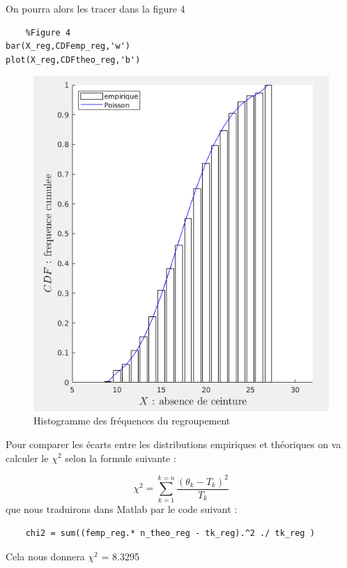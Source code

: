 \documentclass[a4paper,oneside]{article}
\makeatletter
\def\bigcenter{\trivlist \bigcentering\item\relax}
\def\bigcentering{\let\\\@centercr\rightskip\@bigflushglue%
\leftskip\@bigflushglue
\parindent\z@\parfillskip\z@skip}
\makeatother
\begin{document}
\begin{enumerate}
On pourra alors les tracer dans la figure 4 

\begin{lstlisting}
	%Figure 4
bar(X_reg,CDFemp_reg,'w')
plot(X_reg,CDFtheo_reg,'b')
\end{lstlisting}


\begin{figure}[h!]
\bigcenter
\includegraphics[scale=0.7]{fig2_sub2.png}
\caption{Histogramme des fréquences du regroupement}
\end{figure}
\newpage
\item

Pour comparer les écarts entre les distributions empiriques et théoriques on va calculer le $\chi^2$
selon la formule suivante :

\[
	\chi^2 = \sum_{k=1}^{k=n} \frac{(\theta_k - T_k)^2}{T_k}
\]
 que nous traduirons dans Matlab par le code suivant :
\begin{lstlisting}
	chi2 = sum((femp_reg.* n_theo_reg - tk_reg).^2 ./ tk_reg ) 
\end{lstlisting}

Cela nous donnera $\chi^2$ = 8.3295


\end{enumerate}
\end{document}
